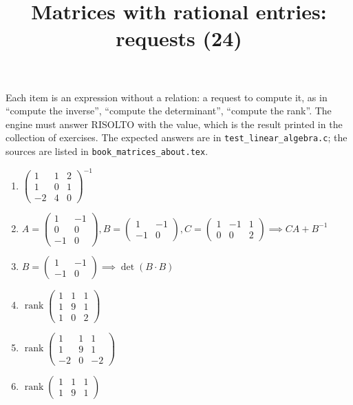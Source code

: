 \documentclass[11pt,a4paper]{article}
\title{Matrices with rational entries: requests (24)}
\author{}
\date{}
\begin{document}
\maketitle
Each item is an expression without a relation: a request to compute it, as in ``compute the inverse'', ``compute the determinant'', ``compute the rank''. The engine must answer RISOLTO with the value, which is the result printed in the collection of exercises. The expected answers are in \texttt{test\_linear\_algebra.c}; the sources are listed in \texttt{book\_matrices\_about.tex}.

\begin{enumerate}
\item $\displaystyle \begin{pmatrix} 1 & 1 & 2 \\ 1 & 0 & 1 \\ -2 & 4 & 0 \end{pmatrix}^{-1}$
\item $\displaystyle A = \begin{pmatrix} 1 & -1 \\ 0 & 0 \\ -1 & 0 \end{pmatrix}, B = \begin{pmatrix} 1 & -1 \\ -1 & 0 \end{pmatrix}, C = \begin{pmatrix} 1 & -1 & 1 \\ 0 & 0 & 2 \end{pmatrix} \implies C A + B^{-1}$
\item $\displaystyle B = \begin{pmatrix} 1 & -1 \\ -1 & 0 \end{pmatrix} \implies \det\left( B \cdot B \right)$
\item $\displaystyle \operatorname{rank} \begin{pmatrix} 1 & 1 & 1 \\ 1 & 9 & 1 \\ 1 & 0 & 2 \end{pmatrix}$
\item $\displaystyle \operatorname{rank} \begin{pmatrix} 1 & 1 & 1 \\ 1 & 9 & 1 \\ -2 & 0 & -2 \end{pmatrix}$
\item $\displaystyle \operatorname{rank} \begin{pmatrix} 1 & 1 & 1 \\ 1 & 9 & 1 \end{pmatrix}$

\end{enumerate}
\end{document}
